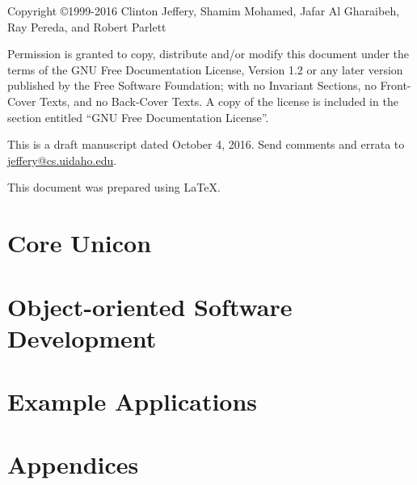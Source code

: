 \documentclass[letterpaper,twoside,12pt]{book}
\begin{document}
\thispagestyle{empty}
\bigskip
\bigskip
Copyright \copyright 1999-2016 Clinton Jeffery, Shamim Mohamed,
Jafar Al Gharaibeh, Ray Pereda, and Robert Parlett

Permission is granted to copy, distribute and/or modify this document under the
terms of the GNU Free Documentation License, Version 1.2 or any later version
published by the Free Software Foundation; with no Invariant Sections, no
Front-Cover Texts, and no Back-Cover Texts. A copy of the license is included in
the section entitled ``GNU Free Documentation License''.
\bigskip


This is a draft manuscript dated October 4, 2016.  Send comments and errata
to \linebreak \href{mailto:jeffery@cs.uidaho.edu}{jeffery@cs.uidaho.edu}.

\bigskip
This document was prepared using \LaTeX.
\clearpage

\frontmatter
\setcounter{tocdepth}{2}
\tableofcontents


\mainmatter



\part{Core Unicon}











\part{Object-oriented Software Development}







\part{Example Applications}








\part{Appendices}
\appendix







% 

\backmatter


\small
\printindex
\end{document}
